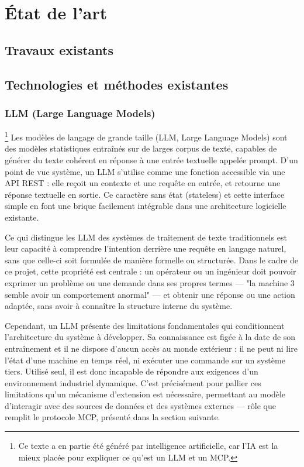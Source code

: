 \chapter{État de l'art}


\section{Travaux existants}

\section{Technologies et méthodes existantes}
\subsection{LLM (Large Language Models)}\footnote{Ce texte a en partie été généré par intelligence artificielle, car l'IA est la mieux placée pour expliquer ce qu'est un LLM et un MCP.}
Les modèles de langage de grande taille (LLM, Large Language Models) sont des modèles statistiques entraînés sur de larges corpus de texte, capables de générer du texte cohérent en réponse à une entrée textuelle appelée prompt. D'un point de vue système, un LLM s'utilise comme une fonction accessible via une API REST : elle reçoit un contexte et une requête en entrée, et retourne une réponse textuelle en sortie. Ce caractère sans état (stateless) et cette interface simple en font une brique facilement intégrable dans une architecture logicielle existante.

Ce qui distingue les LLM des systèmes de traitement de texte traditionnels est leur capacité à comprendre l'intention derrière une requête en langage naturel, sans que celle-ci soit formulée de manière formelle ou structurée. Dans le cadre de ce projet, cette propriété est centrale : un opérateur ou un ingénieur doit pouvoir exprimer un problème ou une demande dans ses propres termes — "la machine 3 semble avoir un comportement anormal" — et obtenir une réponse ou une action adaptée, sans avoir à connaître la structure interne du système.

Cependant, un LLM présente des limitations fondamentales qui conditionnent l'architecture du système à développer. Sa connaissance est figée à la date de son entraînement et il ne dispose d'aucun accès au monde extérieur : il ne peut ni lire l'état d'une machine en temps réel, ni exécuter une commande sur un système tiers. Utilisé seul, il est donc incapable de répondre aux exigences d'un environnement industriel dynamique. C'est précisément pour pallier ces limitations qu'un mécanisme d'extension est nécessaire, permettant au modèle d'interagir avec des sources de données et des systèmes externes — rôle que remplit le protocole MCP, présenté dans la section suivante.




